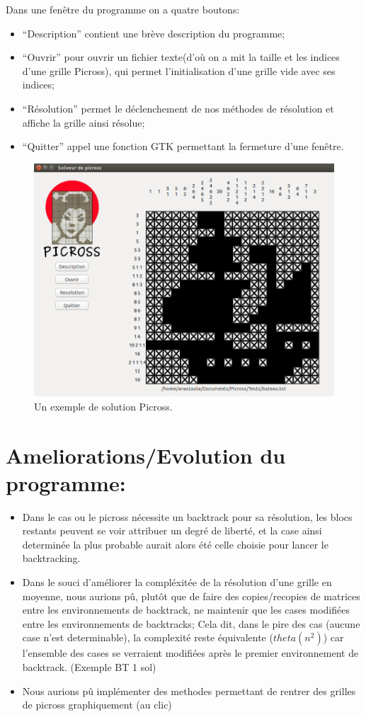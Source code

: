 \documentclass{article}
\begin{document}
Dans une fenêtre du programme on a quatre boutons:
\begin{itemize}
\item  ``Description'' contient une brève description du programme;
\item ``Ouvrir'' pour ouvrir un fichier texte(d'où on a mit la taille et les indices d'une grille Picross), qui permet l'initialisation d'une grille vide avec ses indices;
\item ``Résolution'' permet le déclenchement de nos méthodes de résolution et affiche la grille ainsi résolue;
\item ``Quitter'' appel une fonction GTK permettant la fermeture d'une fenêtre.
\end{itemize}
\begin{figure}[h]
\begin{center}
\includegraphics[width=15cm]{picross}
\end{center}
\caption{Un exemple de solution Picross.}
\end{figure}

\section{Ameliorations/Evolution du programme:}
\begin{itemize}
\item Dans le cas ou le picross nécessite un backtrack pour sa résolution, les blocs restants peuvent se voir attribuer un degré de liberté, et la case ainsi determinée la plus probable aurait alors été celle choisie pour lancer le backtracking.
\item Dans le souci d'améliorer la compléxitée de la résolution d'une grille en moyenne, nous aurions pû, plutôt que de faire des copies/recopies de matrices entre les environnements de backtrack, ne maintenir que les cases modifiées entre les environnements de backtracks;
Cela dit, dans le pire des cas (aucune case n'est determinable), la complexité reste équivalente ($theta(n^2)$) car l'ensemble des cases se verraient modifiées après le premier environnement de backtrack. (Exemple BT 1 sol)
\item Nous aurions pû implémenter des methodes permettant de rentrer des grilles de picross graphiquement (au clic)
\end{itemize}
\end{document}
